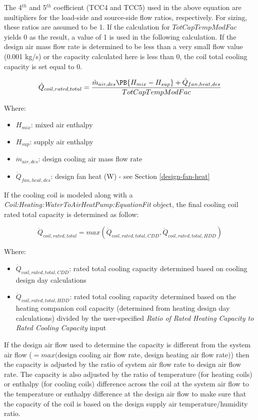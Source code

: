 The 4\(^{th}\) and 5\(^{th}\) coefficient (TCC4 and TCC5) used in the above equation are multipliers for the load-side and source-side flow ratios, respectively. For sizing, these ratios are assumed to be 1. If the calculation for $TotCapTempModFac$ yields 0 as the result, a value of 1 is used in the following calculation. If the design air mass flow rate is determined to be less than a very small flow value (0.001 kg/s) or the capacity calculated here is less than 0, the coil total cooling capacity is set equal to 0.

\begin{equation}
  \dot{Q}_{coil,rated,total}   = \frac{\dot{m}_{air,des}\PB{H_{mix}-H_{sup}}+ \dot{Q}_{fan,heat,des}}{TotCapTempModFac}
\end{equation}

Where:

\begin{itemize}
\item \(H_{mix}\): mixed air enthalpy
\item \(H_{sup}\): supply air enthalpy
\item \(\dot{m}_{air,des}\): design cooling air mass flow rate
\item \(\dot{Q}_{fan,heat,des}\): design fan heat (W) - see Section \ref{design-fan-heat}
\end{itemize}

If the cooling coil is modeled along with a \emph{Coil:Heating:WaterToAirHeatPump:EquationFit} object, the final cooling coil rated total capacity is determined as follow:

\begin{equation}
  \dot{Q}_{coil,rated,total} = max(\dot{Q}_{coil,rated,total,CDD}, \dot{Q}_{coil,rated,total,HDD})
\end{equation}

Where:

\begin{itemize}
\item \(\dot{Q}_{coil,rated,total,CDD}\): rated total cooling capacity determined based on cooling design day calculations
\item \(\dot{Q}_{coil,rated,total,HDD}\): rated total cooling capacity determined based on the heating companion coil capacity (determined from heating design day calculations) divided by the user-specified \emph{Ratio of Rated Heating Capacity to Rated Cooling Capacity} input
\end{itemize}

If the design air flow used to determine the capacity is different from the system air flow ($= max($design cooling air flow rate, design heating air flow rate$)$) then the capacity is adjusted by the ratio of system air flow rate to design air flow rate. The capacity is also adjusted by the ratio of temperature (for heating coils) or enthalpy (for cooling coils) difference across the coil at the system air flow to the temperature or enthalpy difference at the design air flow to make sure that the capacity of the coil is based on the design supply air temperature/humidity ratio.

